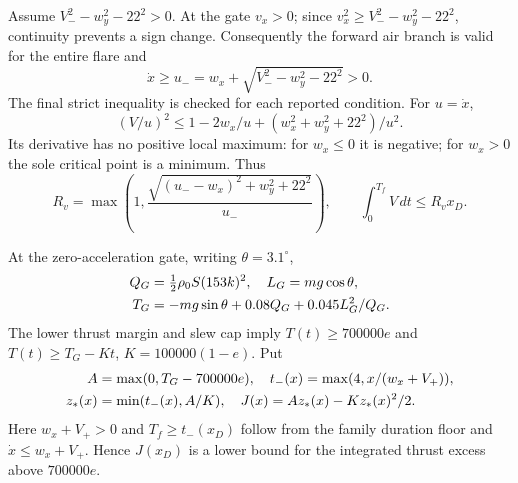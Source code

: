 Assume $V_-^2-w_y^2-22^2>0$. At the gate $v_x>0$; since $v_x^2\geq V_-^2-w_y^2-22^2$, continuity prevents a sign change. Consequently the forward air branch is valid for the entire flare and
\begin{equation}\label{eq:umin}
 \dot x\geq u_-=w_x+\sqrt{V_-^2-w_y^2-22^2}>0.
\end{equation}
The final strict inequality is checked for each reported condition. For $u=\dot x$,
\[
 (V/u)^2\leq1-2w_x/u+(w_x^2+w_y^2+22^2)/u^2.
\]
Its derivative has no positive local maximum: for $w_x\leq0$ it is negative; for $w_x>0$ the sole critical point is a minimum. Thus
\begin{equation}\label{eq:ratio}
 R_v=\max\left(1,\frac{\sqrt{(u_--w_x)^2+w_y^2+22^2}}{u_-}\right),
 \qquad \int_0^{T_f}V\,dt\leq R_v x_D.
\end{equation}

At the zero-acceleration gate, writing $\theta=3.1^\circ$,
\begin{align}\label{eq:gateT}
 Q_G&=\tfrac12\rho_0 S(153k)^2,\quad L_G=mg\cos\theta,\notag\\
 T_G&=-mg\sin\theta+0.08Q_G+0.045L_G^2/Q_G.
\end{align}
The lower thrust margin and slew cap imply $T(t)\geq700000e$ and $T(t)\geq T_G-Kt$, $K=100000(1-e)$. Put
\begin{align}\label{eq:ramp}
 A&=\max(0,T_G-700000e),\quad t_-(x)=\max(4,x/(w_x+V_+)),\notag\\
 z_*(x)&=\min(t_-(x),A/K),\quad J(x)=Az_*(x)-Kz_*(x)^2/2.
\end{align}
Here $w_x+V_+>0$ and $T_f\geq t_-(x_D)$ follow from the family duration floor and $\dot x\leq w_x+V_+$. Hence $J(x_D)$ is a lower bound for the integrated thrust excess above $700000e$.

